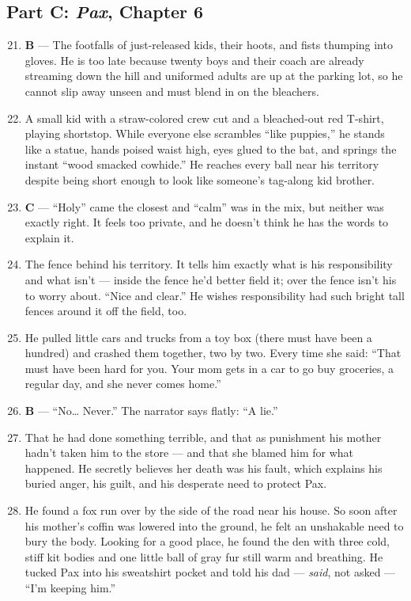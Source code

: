 \documentclass[11pt]{article}
\begin{document}
\subsection*{Part C: \textit{Pax}, Chapter 6}
\begin{enumerate}\setcounter{enumi}{20}
  \item \textbf{B} --- The footfalls of just-released kids, their hoots, and fists thumping into gloves. He is too late because twenty boys and their coach are already streaming down the hill and uniformed adults are up at the parking lot, so he cannot slip away unseen and must blend in on the bleachers.
  \item A small kid with a straw-colored crew cut and a bleached-out red T-shirt, playing shortstop. While everyone else scrambles ``like puppies,'' he stands like a statue, hands poised waist high, eyes glued to the bat, and springs the instant ``wood smacked cowhide.'' He reaches every ball near his territory despite being short enough to look like someone's tag-along kid brother.
  \item \textbf{C} --- ``Holy'' came the closest and ``calm'' was in the mix, but neither was exactly right. It feels too private, and he doesn't think he has the words to explain it.
  \item The fence behind his territory. It tells him exactly what is his responsibility and what isn't --- inside the fence he'd better field it; over the fence isn't his to worry about. ``Nice and clear.'' He wishes responsibility had such bright tall fences around it off the field, too.
  \item He pulled little cars and trucks from a toy box (there must have been a hundred) and crashed them together, two by two. Every time she said: ``That must have been hard for you. Your mom gets in a car to go buy groceries, a regular day, and she never comes home.''
  \item \textbf{B} --- ``No\dots{} Never.'' The narrator says flatly: ``A lie.''
  \item That he had done something terrible, and that as punishment his mother hadn't taken him to the store --- and that she blamed him for what happened. He secretly believes her death was his fault, which explains his buried anger, his guilt, and his desperate need to protect Pax.
  \item He found a fox run over by the side of the road near his house. So soon after his mother's coffin was lowered into the ground, he felt an unshakable need to bury the body. Looking for a good place, he found the den with three cold, stiff kit bodies and one little ball of gray fur still warm and breathing. He tucked Pax into his sweatshirt pocket and told his dad --- \textit{said}, not asked --- ``I'm keeping him.''

\end{enumerate}
\end{document}
